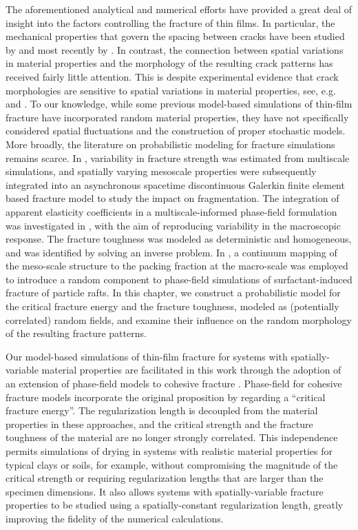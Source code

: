 The aforementioned analytical and numerical efforts have provided a great deal of insight into the factors controlling the fracture of thin films.  In particular, the mechanical properties that govern the spacing between cracks have been studied by \citet{hutchinson1991mixed, xia2000crack} and most recently by \citet{yin2008explicit}. In contrast,  the connection between spatial variations in material properties and the morphology of the resulting crack patterns has received fairly little attention. This is despite experimental evidence that crack morphologies are sensitive to spatial variations in material properties, see, e.g. \citet{kitsunezaki2016shaking, kitsunezaki2017stress, halasz2017effect, kitsunezaki2017memory} and \citet{nakahara2018mechanism}. To our knowledge, while some previous model-based simulations of thin-film fracture have incorporated random material properties, they have not specifically considered spatial fluctuations and the construction of proper stochastic models. More broadly, the literature on probabilistic modeling for fracture simulations remains scarce. In \cite{Acton2018}, variability in fracture strength was estimated from multiscale simulations, and spatially varying mesoscale properties were subsequently integrated into an asynchronous spacetime discontinuous Galerkin finite element based fracture model to study the impact on fragmentation. The integration of apparent elasticity coefficients in a multiscale-informed phase-field formulation was investigated in \cite{Hun2019}, with the aim of reproducing variability in the macroscopic response. The fracture toughness was modeled as deterministic and homogeneous, and was identified by solving an inverse problem. In \cite{Peco2019}, a continuum mapping of the meso-scale structure to the packing fraction at the macro-scale was employed to introduce a random component to phase-field simulations of surfactant-induced fracture of particle rafts. In this chapter, we construct a probabilistic model for the critical fracture energy and the fracture toughness, modeled as (potentially correlated) random fields, and examine their influence on the random morphology of the resulting fracture patterns.

Our model-based simulations of thin-film fracture for systems with spatially-variable material properties are facilitated in this work through the adoption of an extension of phase-field models to cohesive fracture \cite{wu2016thermodynamically, wu2017unified, geelen2019phase}. Phase-field for cohesive fracture models incorporate the original proposition by \citet{xia2000crack} regarding a ``critical fracture energy''. The regularization length is decoupled from the material properties in these approaches, and the critical strength and the fracture toughness of the material are no longer strongly correlated. This independence permits simulations of drying in systems with realistic material properties for typical clays or soils, for example, without compromising the magnitude of the critical strength or requiring  regularization lengths that are larger than the specimen dimensions.  It also allows systems with spatially-variable fracture properties to be studied using a spatially-constant regularization length,  greatly improving the fidelity of the numerical calculations.

